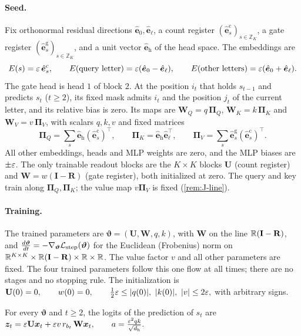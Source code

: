 \paragraph{Seed.} Fix orthonormal residual directions $\hat{\bm e}_0,\hat{\bm e}_\ell$, a count register $(\hat{\bm e}^{\mathrm c}_s)_{s\in\mathbb Z_K}$, a gate register
$(\hat{\bm e}^{\mathrm g}_s)_{s\in\mathbb Z_K}$, and a unit vector $\hat{\bm e}_{\mathrm h}$ of the head space. The embeddings are
\[
 E(s)=\varepsilon\,\hat{\bm e}^{\mathrm c}_s,\qquad E(\text{query letter})=\varepsilon(\hat{\bm e}_0-\hat{\bm e}_\ell),\qquad E(\text{other letters})=\varepsilon(\hat{\bm e}_0+\hat{\bm e}_\ell).
\]
The gate head is head $1$ of block $2$. At the position $i_t$ that holds $s_{t-1}$ and predicts $s_t$ ($t\ge2$), its fixed mask admits
$i_t$ and the position $j_t$ of the current letter, and its relative bias is zero. Its maps are $\mathbf W_Q=q\,\bm\Pi_Q$, $\mathbf W_K=k\,\bm\Pi_K$ and
$\mathbf W_V=v\,\bm\Pi_V$, with scalars $q,k,v$ and fixed matrices
\[
 \bm\Pi_Q=\textstyle\sum_s\hat{\bm e}_{\mathrm h}(\hat{\bm e}^{\mathrm c}_s)^{\!\top},\qquad \bm\Pi_K=\hat{\bm e}_{\mathrm h}\hat{\bm e}_\ell^{\top},\qquad \bm\Pi_V=\sum_s\hat{\bm e}^{\mathrm g}_s(\hat{\bm e}^{\mathrm c}_s)^{\!\top}.
\]
All other embeddings, heads and MLP weights are zero, and the MLP biases are $\pm\varepsilon$. The only trainable readout blocks are the
$K\times K$ blocks $\mathbf U$ (count register) and $\mathbf W=w(\mathbf I-\mathbf R)$ (gate register), both initialized at zero.
The query and key train along $\bm\Pi_Q,\bm\Pi_K$; the value map $v\bm\Pi_V$ is fixed (\cref{rem:J-line}).

\paragraph{Training.} The trained parameters are $\bm\vartheta=(\mathbf U,\mathbf W,q,k)$, with $\mathbf W$ on the line $\mathbb R(\mathbf I-\mathbf R)$, and
$\ddt{\bm\vartheta}=-\nabla_{\bm\vartheta}\Lstep(\bm\vartheta)$ for the Euclidean (Frobenius) norm on $\mathbb R^{K\times K}\times\mathbb R(\mathbf I-\mathbf R)\times\mathbb R\times\mathbb R$. The value factor $v$
and all other parameters are fixed. The four trained parameters follow this one flow at all times; there are no stages and no stopping
rule. The initialization is
 $\mathbf U(0)=0,\qquad w(0)=0,\qquad \tfrac{1}{2}\initscale\le|q(0)|,\ |k(0)|,\ |v|\le2\initscale,$ 
with arbitrary signs.

\begin{lemma}
\label{lem:J-features}
For every $\bm\vartheta$ and $t\ge2$, the logits of the prediction of $s_t$ are
 $\bm z_t=\varepsilon \mathbf U\bm x_t+\varepsilon v\,r_{b_t}\,\mathbf W\bm x_t,\qquad a=\frac{\varepsilon^2qk}{\sqrt{d_{\mathrm h}}}.$ 
\end{lemma}

